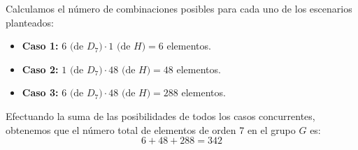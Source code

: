 \documentclass[12pt]{article}
\begin{document}
\begin{ejercicio}[0.5 puntos]
        Calculamos el número de combinaciones posibles para cada uno de los escenarios planteados:
        \begin{itemize}
            \item \textbf{Caso 1:} $6 \text{ (de } D_7) \cdot 1 \text{ (de } H) = 6$ elementos.
            \item \textbf{Caso 2:} $1 \text{ (de } D_7) \cdot 48 \text{ (de } H) = 48$ elementos.
            \item \textbf{Caso 3:} $6 \text{ (de } D_7) \cdot 48 \text{ (de } H) = 288$ elementos.
        \end{itemize}
        Efectuando la suma de las posibilidades de todos los casos concurrentes, obtenemos que el número total de elementos de orden 7 en el grupo $G$ es:
        \[ 6 + 48 + 288 = 342 \]
    \end{ejercicio}
\end{document}
